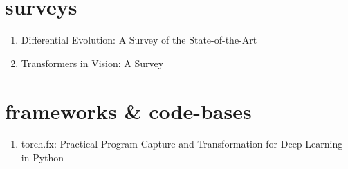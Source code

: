\documentclass[acmlarge]{acmart}
\begin{document}
\section{surveys}
\begin{enumerate}
	\item Differential Evolution: A Survey of the State-of-the-Art \cite{Das2011DifferentialEA} 

	\item Transformers in Vision: A Survey \cite{Khan2022TransformersIV} 

\end{enumerate}
\section{frameworks & code-bases}
\begin{enumerate}
	\item torch.fx: Practical Program Capture and Transformation for Deep Learning in Python \cite{Reed2021torchfxPP} 

\end{enumerate}
\end{document}
